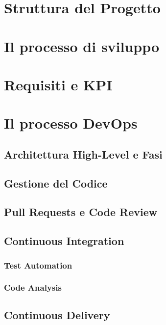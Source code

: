 \documentclass[a4paper,12pt]{report}
\begin{document}
	\section{Struttura del Progetto}
	
	\section{Il processo di sviluppo}
	
	\section{Requisiti e KPI}
	
	\section{Il processo DevOps}
	
	\subsection{Architettura High-Level e Fasi}
	
	\subsection{Gestione del Codice}
	
	\subsection{Pull Requests e Code Review}
	
	\subsection{Continuous Integration}
	
	\subsubsection{Test Automation}
	
	\subsubsection{Code Analysis}
	
	\subsection{Continuous Delivery}
	
\end{document}
